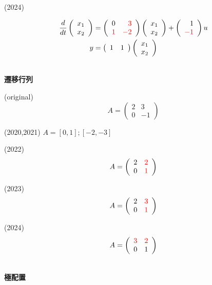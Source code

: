 \documentclass[a4paper,11pt,fleqn]{jreport}
\begin{document}
(2024)

\def\chrA{\left(\begin{array}{rr} 0 &  \color{red} 3\\  \color{red} 1 &  \color{red} -2 \end{array}\right)}
\def\chrB{\left(\begin{array}{r} 1\\  \color{red} -1 \end{array}\right)}
\def\chrC{\left(\begin{array}{rr} 1 & 1 \end{array}\right)}
\def\statev{
	\left (
	\begin{array}{c}
	 x_1 \\ x_2 
	\end{array}
	\right )
}

\begin{align*}
	\frac{d}{dt} \statev 
	&= \chrA \statev + \chrB u
\\
	y 
	&= \chrC \statev
\end{align*}

\ \\ \noindent
{\bf 遷移行列}

(original)
\[
	A= \left(\begin{array}{cc}
		2 & 3 \\
		0 & -1
	   \end{array} \right )
\]

(2020,2021) $A=[0,1];[-2,-3]$

(2022)
\[
	A= \left(\begin{array}{cc}
		2 & \color{red} 2 \\
		0 & \color{red} 1
	   \end{array} \right )
\]



(2023)
\[
	A= \left(\begin{array}{cc}
		2 & \color{red} 3 \\
		0 & \color{red} 1
	   \end{array} \right )
\]

(2024)
\[
    A= \left(\begin{array}{cc} \color{red}3 & \color{red}2\\ 0 & 1 \end{array}\right)
\]

\ \\ \noindent
{\bf 極配置}
\end{document}
